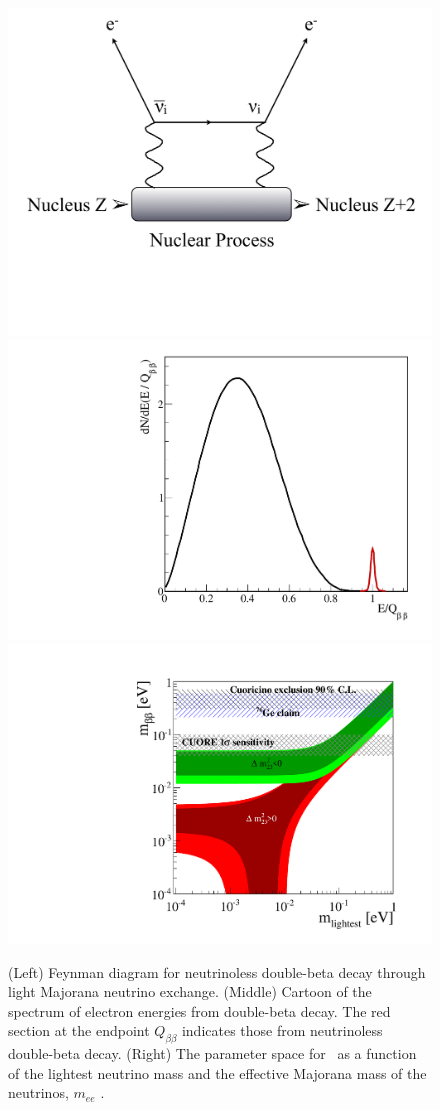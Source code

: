 \begin{figure}
\begin{center}
\includegraphics[trim = 0mm 10mm 0mm 5mm, clip, width=0.3\columnwidth]{figs/0nBB.pdf} 
\includegraphics[width=0.25\columnwidth]{figs/CartoonBB.pdf}
\includegraphics[trim=0.3cm 0.08cm 0.5cm 0.1cm, clip=true, width=0.26\columnwidth]{figs/M_bb_vs_m1_CL-2012.pdf} 
\end{center}
\caption{\footnotesize\label{fig0nuBB}  (Left) Feynman diagram for neutrinoless double-beta decay through light Majorana neutrino exchange. (Middle) Cartoon of the spectrum of electron energies from double-beta decay. The red section at the endpoint $Q_{\beta \beta}$ indicates those from neutrinoless double-beta decay\cite{RevBB}. (Right) The parameter space for \zeronu~as a function of the lightest neutrino mass  and the effective Majorana mass of the neutrinos, $m_{ee}$ \cite{Alessandria:2011rc}. }%
\end{figure}

